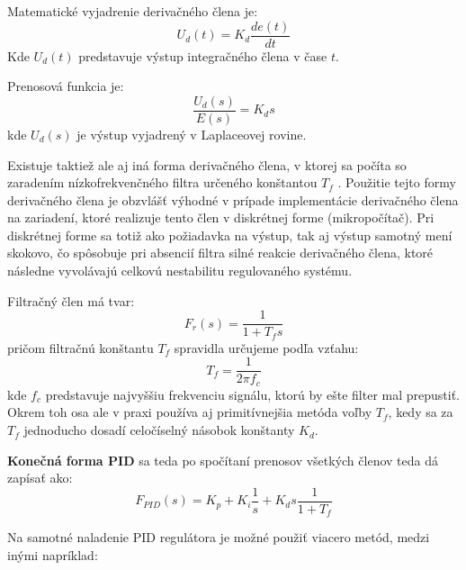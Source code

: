 Matematické vyjadrenie derivačného člena je:
\begin{equation}
U_d (t) = K_d\dfrac{ de(t) }{ dt }
\end{equation}
Kde $U_d(t)$ predstavuje výstup integračného člena v čase $t$.
 
Prenosová funkcia je:
\begin{equation}
\dfrac{U_d( s )}{ E(s) } = K_d s
\end{equation}
kde $U_d(s)$ je výstup vyjadrený v Laplaceovej rovine.

Existuje taktiež ale aj iná forma derivačného člena, v ktorej sa počíta so zaradením nízkofrekvenčného filtra určeného konštantou $T_f$ . Použitie tejto formy derivačného člena je obzvlášť výhodné v prípade implementácie derivačného člena na zariadení, ktoré realizuje tento člen v diskrétnej forme (mikropočítač). Pri diskrétnej forme sa totiž ako požiadavka na výstup, tak aj výstup samotný mení skokovo, čo spôsobuje pri absencií filtra silné reakcie derivačného člena, ktoré následne vyvolávajú celkovú nestabilitu  regulovaného systému.  

Filtračný člen má tvar:
\begin{equation}
F_r ( s ) = \dfrac { 1 }{ 1 + T_f s }
\end{equation}
pričom filtračnú konštantu $T_f$  spravidla určujeme podľa vzťahu:
\begin{equation}
T_f =  \dfrac {1} { 2 \pi f_c }
\label{eq:TFconst}
\end{equation}
kde $f_c$ predstavuje najvyššiu frekvenciu signálu, ktorú by ešte filter mal prepustiť. Okrem toh osa ale v praxi používa aj primitívnejšia metóda voľby $T_f$, kedy sa za $T_f$ jednoducho dosadí  celočíselný násobok konštanty $K_d$.

\textbf{Konečná forma PID} sa teda po spočítaní prenosov všetkých členov teda dá zapísať ako:
\begin{equation}
F_{PID} (s) = K_p + K_i \dfrac{1}{s} + K_d s \dfrac{ 1 } { 1 + T_f }
\label{eq:compPID}
\end{equation}

Na samotné naladenie \ac{PID} regulátora je možné použiť viacero metód, medzi inými napríklad:

